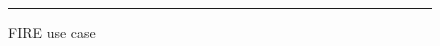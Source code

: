 \begin{figure}[htbp]
  \centering
    \rule{35em}{0.5pt}
  \caption[FIRE use case]{FIRE use case}
  \label{fig:fire}
\end{figure}


